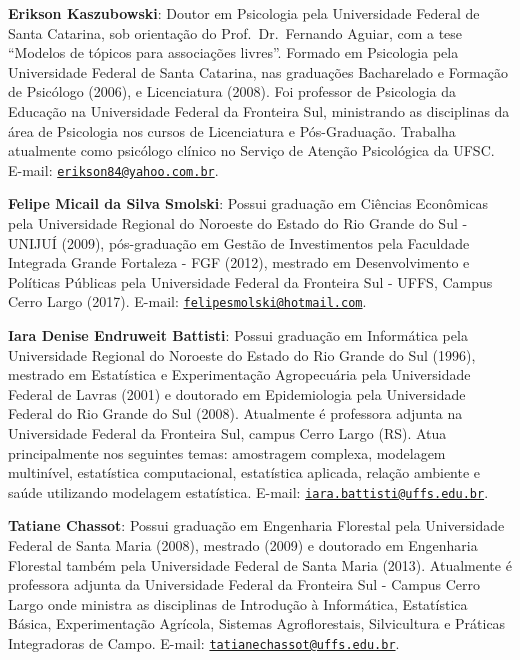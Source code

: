 \documentclass[12pt,portuguese,oneside]{book}
\begin{document}
\textbf{Erikson Kaszubowski}: Doutor em Psicologia pela Universidade
Federal de Santa Catarina, sob orientação do Prof.~Dr.~Fernando Aguiar,
com a tese ``Modelos de tópicos para associações livres''. Formado em
Psicologia pela Universidade Federal de Santa Catarina, nas graduações
Bacharelado e Formação de Psicólogo (2006), e Licenciatura (2008). Foi
professor de Psicologia da Educação na Universidade Federal da Fronteira
Sul, ministrando as disciplinas da área de Psicologia nos cursos de
Licenciatura e Pós-Graduação. Trabalha atualmente como psicólogo clínico
no Serviço de Atenção Psicológica da UFSC. E-mail:
\href{mailto:erikson84@yahoo.com.br}{\nolinkurl{erikson84@yahoo.com.br}}.

\textbf{Felipe Micail da Silva Smolski}: Possui graduação em Ciências
Econômicas pela Universidade Regional do Noroeste do Estado do Rio
Grande do Sul - UNIJUÍ (2009), pós-graduação em Gestão de Investimentos
pela Faculdade Integrada Grande Fortaleza - FGF (2012), mestrado em
Desenvolvimento e Políticas Públicas pela Universidade Federal da
Fronteira Sul - UFFS, Campus Cerro Largo (2017). E-mail:
\href{mailto:felipesmolski@hotmail.com}{\nolinkurl{felipesmolski@hotmail.com}}.

\textbf{Iara Denise Endruweit Battisti}: Possui graduação em Informática
pela Universidade Regional do Noroeste do Estado do Rio Grande do Sul
(1996), mestrado em Estatística e Experimentação Agropecuária pela
Universidade Federal de Lavras (2001) e doutorado em Epidemiologia pela
Universidade Federal do Rio Grande do Sul (2008). Atualmente é
professora adjunta na Universidade Federal da Fronteira Sul, campus
Cerro Largo (RS). Atua principalmente nos seguintes temas: amostragem
complexa, modelagem multinível, estatística computacional, estatística
aplicada, relação ambiente e saúde utilizando modelagem estatística.
E-mail:
\href{mailto:iara.battisti@uffs.edu.br}{\nolinkurl{iara.battisti@uffs.edu.br}}.

\textbf{Tatiane Chassot}: Possui graduação em Engenharia Florestal pela
Universidade Federal de Santa Maria (2008), mestrado (2009) e doutorado
em Engenharia Florestal também pela Universidade Federal de Santa Maria
(2013). Atualmente é professora adjunta da Universidade Federal da
Fronteira Sul - Campus Cerro Largo onde ministra as disciplinas de
Introdução à Informática, Estatística Básica, Experimentação Agrícola,
Sistemas Agroflorestais, Silvicultura e Práticas Integradoras de Campo.
E-mail:
\href{mailto:tatianechassot@uffs.edu.br}{\nolinkurl{tatianechassot@uffs.edu.br}}.
\end{document}
